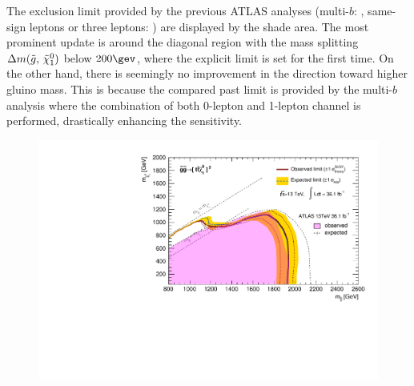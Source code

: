 The exclusion limit provided by the previous ATLAS analyses (multi-$b$: \cite{strong3B_ICHEP2016_CONF}, same-sign leptons or three leptons: \cite{strongSS3L_ICHEP_CONF}) are displayed by the shade area. 
The most prominent update is around the diagonal region with the mass splitting $\Delta m(\tilde{g}, \, \tilde{\chi}_{1}^{0})$ below $200\gev$, where the explicit limit is set for the first time. 
On the other hand, there is seemingly no improvement in the direction toward higher gluino mass. This is because the compared past limit is provided by the multi-$b$ analysis where the combination of both 0-lepton and 1-lepton channel is performed, drastically enhancing the sensitivity.  \\

\begin{figure}[h]
  \begin{center}
    \includegraphics[width=140mm]{figures/Result/exclContour/atlascls_wband1_wfixSigXSecband1_showcms0_myAna_tag858_objRep_shapeSys_excl_GG_symTTN1_fixSigXSecNominal_x12_hypotest__1_harvest_list.pdf}
    \label{fig::Result::exclLimit::GG_ttn1}
  \end{center}
\end{figure}




